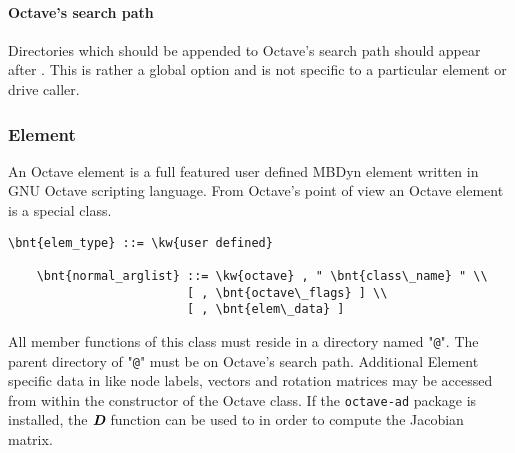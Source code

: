 \paragraph{Octave's search path}
Directories which should be appended to Octave's search path should appear after .
This is rather a global option and is not specific to a particular element or drive caller.

\subsubsection{Element}
An Octave element is a full featured user defined MBDyn element written in GNU Octave scripting language.
From Octave's point of view an Octave element is a special class.
\begin{Verbatim}[commandchars=\\\{\}]
    \bnt{elem_type} ::= \kw{user defined}

    \bnt{normal_arglist} ::= \kw{octave} , " \bnt{class\_name} " \\
                         [ , \bnt{octave\_flags} ] \\
                         [ , \bnt{elem\_data} ]
\end{Verbatim}
All member functions of this class must reside in a directory named "\texttt{@}".
The parent directory of "\texttt{@}" must be on Octave's search path.
Additional Element specific data in  like node labels, vectors and rotation matrices may be accessed from within the constructor of the Octave class. If the \texttt{octave-ad} package is installed, the $\textit{\textbf{D}}$ function can be used to in order to compute the Jacobian matrix.

